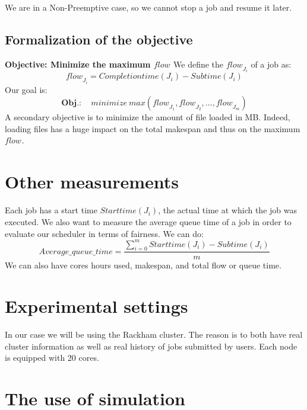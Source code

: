 \documentclass[a4paper]{article}
\newcommand{\Node}[1]{\ensuremath{\mathrm{Node}_{#1}}\xspace}
\newcommand{\flow}[1]{\ensuremath{\mathit{flow}_{#1}}\xspace}
\newcommand{\inputs}{\ensuremath{\mathcal{F}}\xspace}
\newcommand{\submissiontime}{\mathit{Subtime}\xspace}
\newcommand{\completiontime}{\mathit{Completiontime}\xspace}
\newcommand{\start}{\mathit{Starttime}\xspace}
\newcommand{\evict}{\ensuremath{\mathcal{V}}\xspace}
\newcommand{\live}{\ensuremath{L}\xspace}
\begin{document}

We are in a Non-Preemptive case, so we cannot stop a job and resume it later.

\subsection{Formalization of the objective}
\textbf{Objective: Minimize the maximum \flow{}}
		We define the \flow{J_i} of a job as:
		$$
			\flow{J_i} = \completiontime(J_i) - \submissiontime(J_i)
		$$
		Our goal is:
		$$
			\textbf{Obj.}: \quad \mathit{minimize}~\mathit{max}(\flow{J_1}, \flow{J_2}, ..., \flow{J_m})
		$$
A secondary objective is to minimize the amount of file loaded in MB.
Indeed, loading files has a huge impact on the total makespan and thus on the maximum \flow{}.

\section{Other measurements}

Each job has a start time $\start(J_i)$, the actual time at which the job was executed.
We also want to measure the average queue time of a job in order
to evaluate our scheduler in terms of fairness. We can do:
$$
	Average\_queue\_time = \frac{\sum^{m}_{i = 0} \start(J_i) - \submissiontime(J_i)}{m}
$$
We can also have cores hours used, makespan, and total flow or queue time.

\section{Experimental settings}

In our case we will be using the Rackham cluster. The reason is to both have
real cluster information as well as real history of jobs submitted by users.
Each node is equipped with 20 cores.

\section{The use of simulation}
\end{document}
